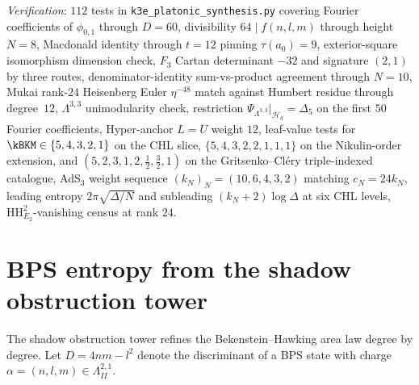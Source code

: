 \noindent\textit{Verification}: $112$ tests in \texttt{k3e\_platonic\_synthesis.py} covering Fourier coefficients of $\phi_{0, 1}$ through $D = 60$, divisibility $64 \mid f(n, l, m)$ through height $N = 8$, Macdonald identity through $t = 12$ pinning $\tau(a_0) = 9$, exterior-square isomorphism dimension check, $F_3$ Cartan determinant $-32$ and signature $(2, 1)$ by three routes, denominator-identity sum-vs-product agreement through $N = 10$, Mukai rank-$24$ Heisenberg Euler $\eta^{-48}$ match against Humbert residue through degree~$12$, $\Lambda^{3, 3}$ unimodularity check, restriction $\Psi_{\Lambda^{3, 3}}\big|_{\mathcal{H}_q} = \Delta_5$ on the first $50$ Fourier coefficients, Hyper-anchor $L = U$ weight $12$, leaf-value tests for $\kBKM \in \{5, 4, 3, 2, 1\}$ on the CHL slice, $\{5,4,3,2,2,1,1,1\}$ on the Nikulin-order extension, and $(5,2,3,1,2,\tfrac12,\tfrac32,1)$ on the Gritsenko--Cl\'ery triple-indexed catalogue, AdS$_3$ weight sequence $(k_N)_N = (10, 6, 4, 3, 2)$ matching $c_N = 24 k_N$, leading entropy $2\pi\sqrt{\Delta/N}$ and subleading $(k_N + 2)\log\Delta$ at six CHL levels, $\mathrm{HH}^2_{E_2}$-vanishing census at rank $24$.

\section{BPS entropy from the shadow obstruction tower}
\label{sec:phys-bps-entropy}

The shadow obstruction tower refines the Bekenstein--Hawking area law degree by degree. Let $D = 4nm - l^2$ denote the discriminant of a BPS state with charge $\alpha = (n, l, m) \in \Lambda^{2,1}_{II}$.

